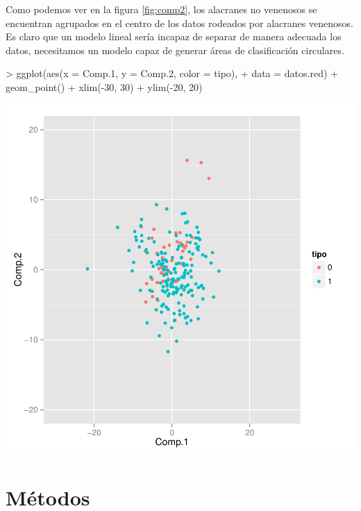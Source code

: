 \documentclass[a4paper, 10pt]{article}
\begin{document}
Como podemos ver en la figura \ref{fig:comp2}, los alacranes no venenosos se encuentran agrupados en el centro de los datos rodeados por alacranes venenosos. Es claro que un modelo lineal sería incapaz de separar de manera adecuada los datos, necesitamos un modelo capaz de generar áreas de clasificación circulares.

\begin{Schunk}
\begin{Sinput}
> ggplot(aes(x = Comp.1, y = Comp.2, color = tipo),
+        data = datos.red) + geom_point() + xlim(-30, 30) + ylim(-20, 20)
\end{Sinput}
\end{Schunk}
\includegraphics{Final-002}

\section{Métodos}
\end{document}
